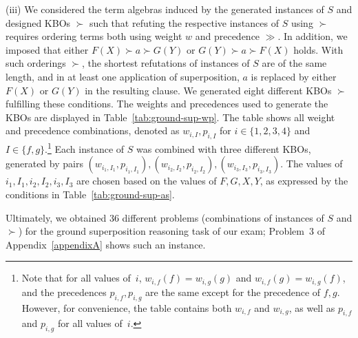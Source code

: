 \noindent(iii) We considered the term algebras induced by the generated
instances of $S$ and designed KBOs $\succ$ such that
refuting the respective instances of $S$ using $\succ$ requires
ordering terms both using weight $w$ and precedence $\gg$. %
In addition, we imposed that  either $F(X) \succ a \succ G(Y)$ 
or $G(Y) \succ a \succ F(X)$ holds. With such orderings $\succ$,
the shortest refutations of instances of $S$ are of the same length, and in
at least one application of superposition, $a$ is replaced by either $F(X)$ or $G(Y)$
in the resulting clause. %
We generated eight different KBOs $\succ$ fulfilling these conditions.
The weights and precedences used to generate the KBOs
are displayed in Table~\ref{tab:ground-sup-wp}.
The table shows all weight and precedence combinations,
denoted as $w_{i, I}, p_{i, I}$ for $i \in \{1, 2, 3, 4\}$
and $I \in \{f, g\}$.\footnote{Note that for all values of~$i$,
$w_{i, f}(f) = w_{i, g}(g)$ and $w_{i, f}(g) = w_{i, g}(f)$,
and the precedences $p_{i, f}, p_{i, g}$ are the same except for
the precedence of $f, g$. However,
for convenience, the table contains both $w_{i, f}$
and $w_{i, g}$, as well as $p_{i, f}$ and $p_{i, g}$ for all values of~$i$.}
Each instance of $S$ was combined with three different KBOs, generated
by pairs
$(w_{i_1, I_1}, p_{i_1, I_1}), (w_{i_2, I_2}, p_{i_2, I_2}), (w_{i_3, I_3}, p_{i_3, I_3})$.
The values of $i_1, I_1, i_2, I_2, i_3, I_3$ are chosen
based on the values of $F, G, X, Y$, as expressed by the
conditions in Table~\ref{tab:ground-sup-as}.
\smallskip

Ultimately, we obtained 36 different problems (combinations of
instances of $S$ and $\succ$) for  the ground
superposition reasoning task of our exam; Problem~3 of
Appendix~\ref{appendixA} shows such an instance.
